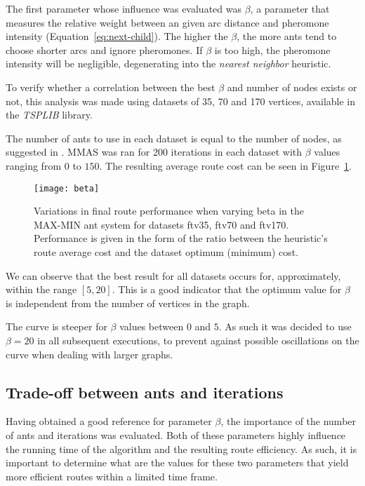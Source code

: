 The first parameter whose influence was evaluated was $\beta$, a parameter that
measures the relative weight between an given arc distance and pheromone
intensity (Equation~\ref{eq:next-child}). The higher the $\beta$, the more ants
tend to choose shorter arcs and ignore pheromones. If $\beta$ is too high, the
pheromone intensity will be negligible, degenerating into the \textit{nearest
neighbor} heuristic.

To verify whether a correlation between the best $\beta$ and number of nodes
exists or not, this analysis was made using datasets of 35, 70 and 170 vertices,
available in the \textit{TSPLIB} library.

The number of ants to use in each dataset is equal to the number of nodes, as
suggested in \cite{Stutzle1997}. MMAS was ran for 200 iterations in each dataset
with $\beta$ values ranging from $0$ to $150$. The resulting average route cost
can be seen in Figure~\ref{fig:beta}.


\begin{figure}[h!]
  \centering
  \texttt{[image: beta]}
  \caption{Variations in final route performance when varying beta in the
  MAX-MIN ant system for datasets ftv35, ftv70 and ftv170. Performance is given
  in the form of the ratio between the heuristic's route average cost and the
  dataset optimum (minimum) cost.}
  \label{fig:beta}
\end{figure}

We can observe that the best result for all datasets occurs for, approximately,
within the range $[5, 20]$. This is a good indicator that the optimum value for
$\beta$ is independent from the number of vertices in the graph.

The curve is steeper for $\beta$ values between $0$ and $5$. As such it was
decided to use $\beta=20$ in all subsequent executions, to prevent against
possible oscillations on the curve when dealing with larger graphs.






\newpage
\subsection{Trade-off between ants and iterations}
\label{section:mmas-tradeoff}

Having obtained a good reference for parameter $\beta$, the importance of the
number of ants and iterations was evaluated. Both of these parameters highly influence
the running time of the algorithm and the resulting route efficiency. As such,
it is important to determine what are the values for these two parameters that
yield more efficient routes within a limited time frame.

